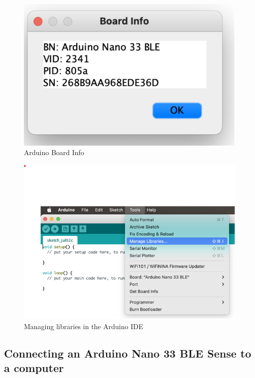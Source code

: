 \begin{figure}[h!]
	\centering
	\includegraphics[width=1.0\textwidth]{Images/Deployment/Arduino-Board-Info}
	\caption{Arduino Board Info} 
	\label{fig:Arduino-Board-Info}
\end{figure}

\begin{figure}[h!]
	\centering
	\includegraphics[width=1.0\textwidth]{Images/Deployment/Managing-libraries-in-the-Arduino-IDE}
	\caption{Managing libraries in the Arduino IDE} 
	\label{fig:Managing-libraries-in-the-Arduino-IDE}
\end{figure}



\subsection{Connecting an Arduino Nano 33 BLE Sense to a computer}

